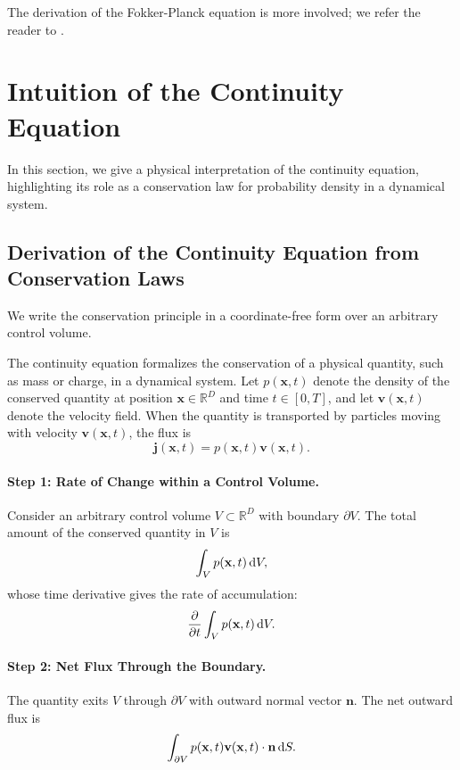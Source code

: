 The derivation of the Fokker-Planck equation is more involved; we refer the reader to .







\newpage
\clearpage

\section{Intuition of the Continuity Equation}\label{sec:intuition-continuity}
In this section, we give a physical interpretation of the continuity equation, highlighting its role as a conservation law for probability density in a dynamical system.

\subsection{Derivation of the Continuity Equation from Conservation Laws}

We write the conservation principle in a coordinate-free form over an arbitrary control volume.

The continuity equation formalizes the conservation of a physical quantity, such as mass or charge, in a dynamical system. Let $p(\mathbf{x}, t)$ denote the density of the conserved quantity at position $\mathbf{x} \in \mathbb{R}^D$ and time $t \in [0, T]$, and let $\mathbf{v}(\mathbf{x}, t)$ denote the velocity field. When the quantity is transported by particles moving with velocity $\mathbf{v}(\mathbf{x},t)$, the flux is
\[
\mathbf{j}(\mathbf{x},t)=p(\mathbf{x},t)\mathbf{v}(\mathbf{x},t).
\]

\paragraph{Step 1: Rate of Change within a Control Volume.}  
Consider an arbitrary control volume $V \subset \mathbb{R}^D$ with boundary $\partial V$. The total amount of the conserved quantity in $V$ is
\[
\int_V p(\mathbf{x}, t) \mathop{}\!\mathrm{d} V,
\]
whose time derivative gives the rate of accumulation:
\[
\frac{\partial}{\partial t} \int_V p(\mathbf{x}, t) \mathop{}\!\mathrm{d} V.
\]

\paragraph{Step 2: Net Flux Through the Boundary.}  
The quantity exits $V$ through $\partial V$ with outward normal vector $\mathbf{n}$. The net outward flux is
\[
\int_{\partial V} p(\mathbf{x}, t) \mathbf{v}(\mathbf{x}, t) \cdot \mathbf{n} \mathop{}\!\mathrm{d} S.
\]


